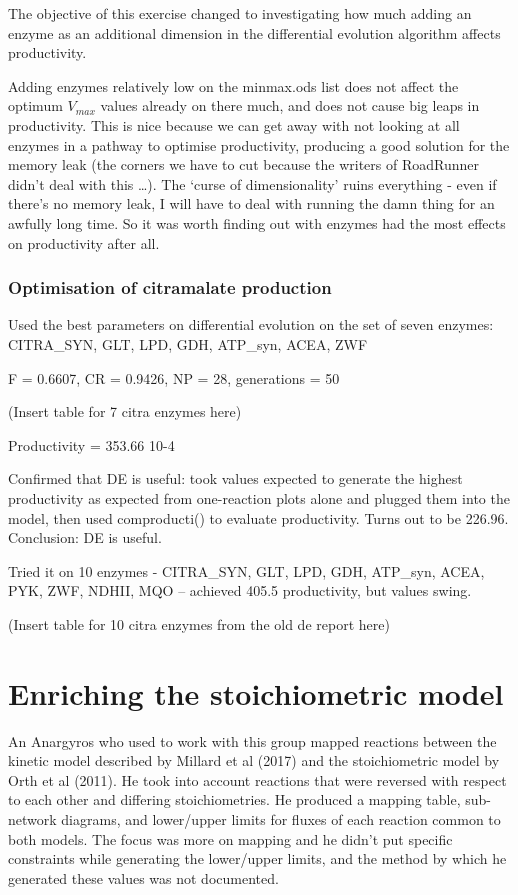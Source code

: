 \documentclass[parskip=full]{scrreprt}
\begin{document}
The objective of this exercise changed to investigating how much adding an enzyme as an additional dimension in the differential evolution algorithm affects productivity.

Adding enzymes relatively low on the minmax.ods list does not affect the optimum $V_{max}$ values already on there much, and does not cause big leaps in productivity. This is nice because we can get away with not looking at all enzymes in a pathway to optimise productivity, producing a good solution for the memory leak (the corners we have to cut because the writers of RoadRunner didn't deal with this \ldots). The `curse of dimensionality' ruins everything - even if there's no memory leak, I will have to deal with running the damn thing for an awfully long time. So it was worth finding out with enzymes had the most effects on productivity after all.

\subsection{Optimisation of citramalate production}
\label{ssec:optcitra}

Used the best parameters on differential evolution on the set of seven enzymes: CITRA\_SYN, GLT, LPD, GDH, ATP\_syn, ACEA, ZWF

F = 0.6607, CR = 0.9426, NP = 28, generations = 50

(Insert table for 7 citra enzymes here)

Productivity = 353.66 10-4

Confirmed that DE is useful: took values expected to generate the highest productivity as expected from one-reaction plots alone and plugged them into the model, then used comproducti() to evaluate productivity. Turns out to be 226.96. Conclusion: DE is useful.

Tried it on 10 enzymes - CITRA\_SYN, GLT, LPD, GDH, ATP\_syn, ACEA, PYK, ZWF, NDHII, MQO -- achieved 405.5 productivity, but values swing.

(Insert table for 10 citra enzymes from the old de report here)

\chapter{Enriching the stoichiometric model}
\label{ch:stoich}

An Anargyros who used to work with this group mapped reactions between the kinetic model described by Millard et al (2017) and the stoichiometric model by Orth et al (2011). He took into account reactions that were reversed with respect to each other and differing stoichiometries. He produced a mapping table, sub-network diagrams, and lower/upper limits for fluxes of each reaction common to both models. The focus was more on mapping and he didn’t put specific constraints while generating the lower/upper limits, and the method by which he generated these values was not documented.
\end{document}
